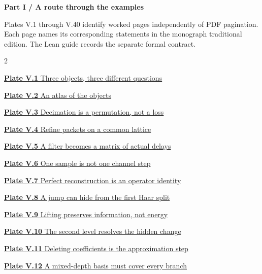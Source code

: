 \documentclass[11pt,letterpaper]{article}
\begin{document}
\KomorebiCover
{}


{\sffamily\bfseries\Large\color{accent}Part I / A route through the examples}\par\medskip
Plates V.1 through V.40 identify worked pages independently of PDF
pagination. Each page names its corresponding statements in the monograph
traditional edition. The Lean guide records the separate formal contract.
\medskip
\begin{multicols}{2}\raggedright
{\small\noindent\hyperlink{vpage1}{\textbf{Plate V.1} Three objects, three different questions}\par\smallskip}
{\small\noindent\hyperlink{vpage2}{\textbf{Plate V.2} An atlas of the objects}\par\smallskip}
{\small\noindent\hyperlink{vpage3}{\textbf{Plate V.3} Decimation is a permutation, not a loss}\par\smallskip}
{\small\noindent\hyperlink{vpage4}{\textbf{Plate V.4} Refine packets on a common lattice}\par\smallskip}
{\small\noindent\hyperlink{vpage5}{\textbf{Plate V.5} A filter becomes a matrix of actual delays}\par\smallskip}
{\small\noindent\hyperlink{vpage6}{\textbf{Plate V.6} One sample is not one channel step}\par\smallskip}
{\small\noindent\hyperlink{vpage7}{\textbf{Plate V.7} Perfect reconstruction is an operator identity}\par\smallskip}
{\small\noindent\hyperlink{vpage8}{\textbf{Plate V.8} A jump can hide from the first Haar split}\par\smallskip}
{\small\noindent\hyperlink{vpage9}{\textbf{Plate V.9} Lifting preserves information, not energy}\par\smallskip}
{\small\noindent\hyperlink{vpage10}{\textbf{Plate V.10} The second level resolves the hidden change}\par\smallskip}
{\small\noindent\hyperlink{vpage11}{\textbf{Plate V.11} Deleting coefficients is the approximation step}\par\smallskip}
{\small\noindent\hyperlink{vpage12}{\textbf{Plate V.12} A mixed-depth basis must cover every branch}\par\smallskip}

\end{multicols}
\end{document}

